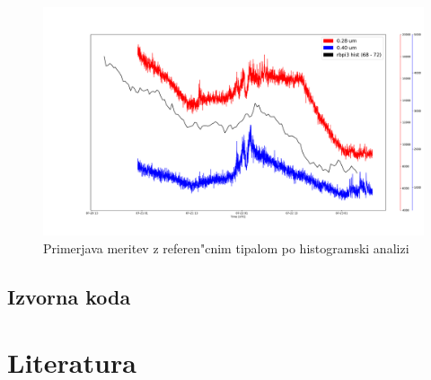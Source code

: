 \documentclass[11pt,a4paper]{article}
\begin{document}
\begin{figure}[H]
	\begin{center}
		\includegraphics[width=16cm]{hist_comparison.pdf}
		\caption{Primerjava meritev z referen"cnim tipalom po histogramski analizi}
		\label{hist_comparison}
	\end{center}
\end{figure}

\clearpage

\begin{appendices}
	\section{Izvorna koda}
\end{appendices}
\clearpage

\section{Literatura}
\printbibliography[heading=none]
\end{document}
